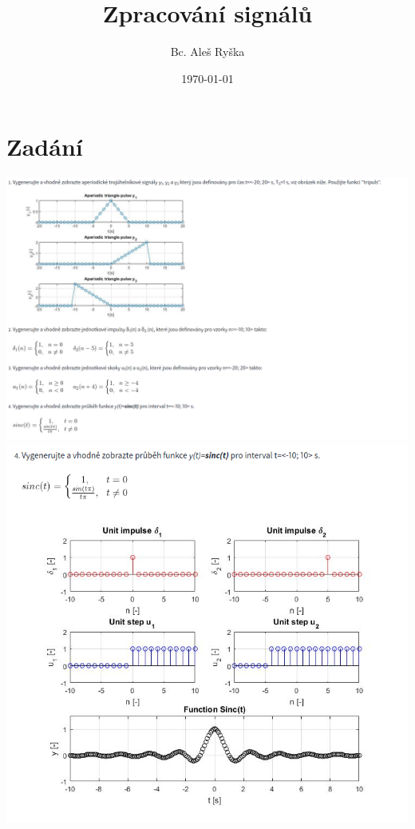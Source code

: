 \documentclass{article}
\title{Zpracování signálů} %
\author{Bc. Aleš Ryška} %
\date{\today} %
\begin{document}
\maketitle %



\section{Zadání}
\includegraphics[scale=0.35]{../assets/zadani.png}
\\
\includegraphics[scale=0.35]{../assets/zadani2.png}
\end{document}

